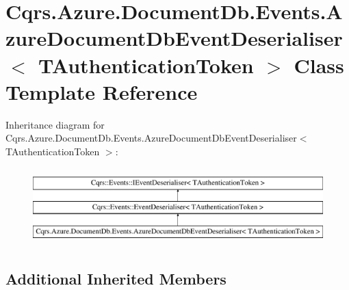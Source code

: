 \hypertarget{classCqrs_1_1Azure_1_1DocumentDb_1_1Events_1_1AzureDocumentDbEventDeserialiser}{}\section{Cqrs.\+Azure.\+Document\+Db.\+Events.\+Azure\+Document\+Db\+Event\+Deserialiser$<$ T\+Authentication\+Token $>$ Class Template Reference}
\label{classCqrs_1_1Azure_1_1DocumentDb_1_1Events_1_1AzureDocumentDbEventDeserialiser}
Inheritance diagram for Cqrs.\+Azure.\+Document\+Db.\+Events.\+Azure\+Document\+Db\+Event\+Deserialiser$<$ T\+Authentication\+Token $>$\+:\begin{figure}[H]
\begin{center}
\leavevmode
\includegraphics[height=3.000000cm]{classCqrs_1_1Azure_1_1DocumentDb_1_1Events_1_1AzureDocumentDbEventDeserialiser}
\end{center}
\end{figure}
\subsection*{Additional Inherited Members}
